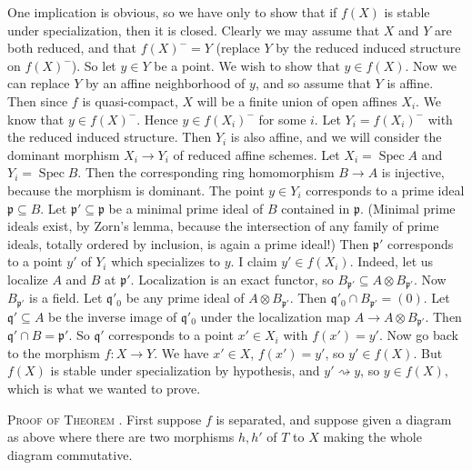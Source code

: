 {\Proof One implication is obvious, so we have only to show that if $f(X)$ is stable under specialization, then it is closed. Clearly we may assume that $X$ and $Y$ are both reduced, and that $f(X)^{-}=Y$ (replace $Y$ by the reduced induced structure on $f(X)^{-}$). So let $y\in Y$ be a point. We wish to show that $y\in f(X)$. Now we can replace $Y$ by an affine neighborhood of $y$, and so assume that $Y$ is affine. Then since $f$ is quasi-compact, $X$ will be a finite union of open affines $X_i$. We know that $y\in f(X)^{-}$. Hence $y\in f(X_i)^{-}$ for some $i$. Let $Y_i=f(X_i)^{-}$ with the reduced induced structure. Then $Y_i$ is also affine, and we will consider the dominant morphism $X_i\to Y_i$ of reduced affine schemes. Let $X_i=\operatorname{Spec}A$ and $Y_i=\operatorname{Spec}B$. Then the corresponding ring homomorphism $B\to A$ is injective, because the morphism is dominant. The point $y\in Y_i$ corresponds to a prime ideal $\mathfrak p\subseteq B$. Let $\mathfrak p'\subseteq\mathfrak p$ be a minimal prime ideal of $B$ contained in $\mathfrak p$. (Minimal prime ideals exist, by Zorn's lemma, because the intersection of any family of prime ideals, totally ordered by inclusion, is again a prime ideal!) Then $\mathfrak p'$ corresponds to a point $y'$ of $Y_i$ which specializes to $y$. I claim $y'\in f(X_i)$. Indeed, let us localize $A$ and $B$ at $\mathfrak p'$. Localization is an exact functor, so $B_{\mathfrak p'}\subseteq A\otimes B_{\mathfrak p'}$. Now $B_{\mathfrak p'}$ is a field. Let $\mathfrak q'_0$ be any prime ideal of $A\otimes B_{\mathfrak p'}$. Then $\mathfrak q'_0\cap B_{\mathfrak p'}=(0)$. Let $\mathfrak q'\subseteq A$ be the inverse image of $\mathfrak q'_0$ under the localization map $A\to A\otimes B_{\mathfrak p'}$. Then $\mathfrak q'\cap B=\mathfrak p'$. So $\mathfrak q'$ corresponds to a point $x'\in X_i$ with $f(x')=y'$. Now go back to the morphism $f\colon X\to Y$. We have $x'\in X$, $f(x')=y'$, so $y'\in f(X)$. But $f(X)$ is stable under specialization by hypothesis, and $y'\rightsquigarrow y$, so $y\in f(X)$, which is what we wanted to prove.

\smallskip
\noindent\textsc{Proof of Theorem .} First suppose $f$ is separated, and suppose given a diagram as above where there are two morphisms $h,h'$ of $T$ to $X$ making the whole diagram commutative.
}

